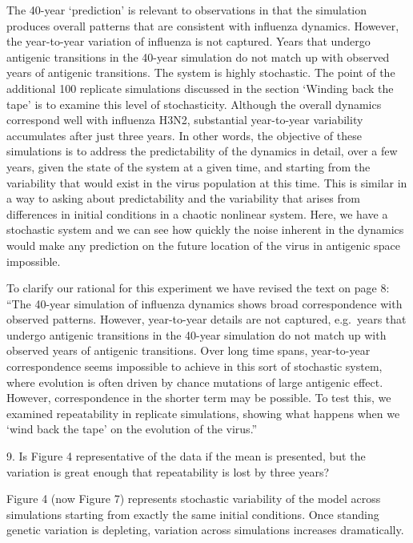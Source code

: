 \documentclass[11pt,oneside,letterpaper]{article}
\def\comment#1{
#1
}
\def\response#1{
\begin{bf}
#1
\end{bf}
}
\def\break{\vspace{0.2cm}}
\begin{document}
\response{The 40-year `prediction' is relevant to observations in that the simulation produces overall patterns that are consistent with influenza dynamics.  However, the year-to-year variation of influenza is not captured.  Years that undergo antigenic transitions in the 40-year simulation do not match up with observed years of antigenic transitions.  The system is highly stochastic.  The point of the additional 100 replicate simulations discussed in the section `Winding back the tape' is to examine this level of stochasticity.  Although the overall dynamics correspond well with influenza H3N2, substantial year-to-year variability accumulates after just three years.  In other words, the objective of these simulations is to address the predictability of the dynamics in detail, over a few years, given the state of the system at a given time, and starting from the variability that would exist in the virus population at this time.  This is similar in a way to asking about predictability and the variability that arises from differences in initial conditions in a chaotic nonlinear system.  Here, we have a stochastic system and we can see how quickly the noise inherent in the dynamics would make any prediction on the future location of the virus in antigenic space impossible.}

\response{To clarify our rational for this experiment we have revised the text on page 8: ``The 40-year simulation of influenza dynamics shows broad correspondence with observed patterns. However, year-to-year details are not captured, e.g.\ years that undergo antigenic transitions in the 40-year simulation do not match up with observed years of antigenic transitions.  Over long time spans, year-to-year correspondence seems impossible to achieve in this sort of stochastic system, where evolution is often driven by chance mutations of large antigenic effect.  However, correspondence in the shorter term may be possible.  To test this, we examined repeatability in replicate simulations, showing what happens when we `wind back the tape' on the evolution of the virus.''}

\break

\comment{9. Is Figure 4 representative of the data if the mean is presented, but the variation is great enough that repeatability is lost by three years?}

\response{Figure 4 (now Figure 7) represents stochastic variability of the model across simulations starting from exactly the same initial conditions.  Once standing genetic variation is depleting, variation across simulations increases dramatically.}
\end{document}
